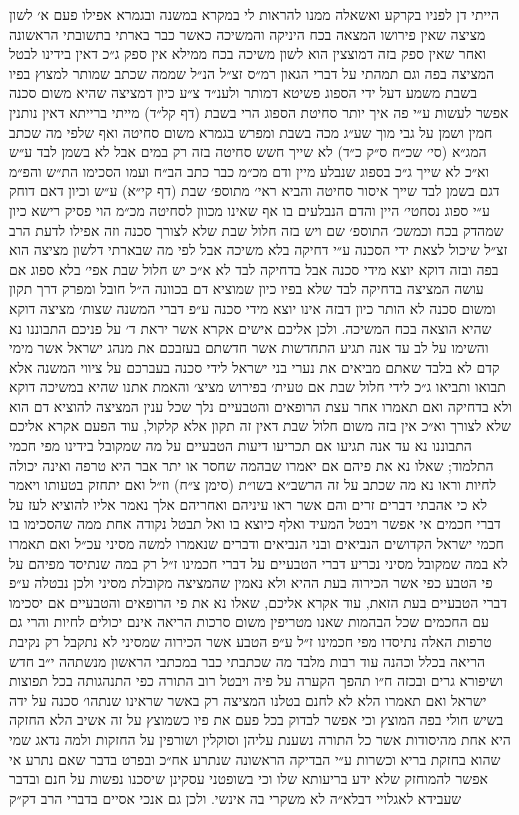 \documentclass[12pt, openany]{book}
\begin{document}
\begin{multicols}{2}
הייתי דן לפניו בקרקע ואשאלה ממנו להראות לי במקרא במשנה ובגמרא אפילו פעם א׳ לשון מציצה שאין פירושו המצאה בכח היניקה והמשיכה כאשר כבר בארתי בתשובתי הראשונה ואחר שאין ספק בזה דמוצצין הוא לשון משיכה בכח ממילא אין ספק ג״כ דאין בידינו לבטל המציצה בפה וגם תמהתי על דברי הגאון רמ״ס זצ״ל הנ״ל שממה שכתב שמותר למצוץ בפיו בשבת משמע דעל ידי הספוג פשיטא דמותר ולענ״ד צ״ע כיון דמציצה שהיא משום סכנה אפשר לעשות ע״י פה איך יותר סחיטת הספוג הרי בשבת (דף קל״ד) מייתי ברייתא דאין נותנין חמין ושמן על גבי מוך שע״ג מכה בשבת ומפרש בגמרא משום סחיטה ואף שלפי מה שכתב המג״א (סי׳ שכ״ח ס״ק כ״ד) לא שייך חשש סחיטה בזה רק במים אבל לא בשמן לבד ע״ש וא״כ לא שייך ג״כ בספוג שנבלע מיין ודם מכ״מ כבר כתב הב״ח ועמו הסכימו הת״ש והפ״מ דגם בשמן לבד שייך איסור סחיטה והביא ראי׳ מתוספ׳ שבת (דף קי״א) ע״ש וכיון דאם דוחק ע״י ספוג נסחטי׳ היין והדם הנבלעים בו אף שאינו מכוון לסחיטה מכ״מ הוי פסיק רישא כיון שמהדק בכח וכמשכ׳ התוספ׳ שם ויש בזה חלול שבת שלא לצורך סכנה וזה אפילו לדעת הרב זצ״ל שיכול לצאת ידי הסכנה ע״י דחיקה בלא משיכה אבל לפי מה שבארתי דלשון מציצה הוא בפה ובזה דוקא יוצא מידי סכנה אבל בדחיקה לבד לא א״כ יש חלול שבת אפי׳ בלא ספוג אם עושה המציצה בדחיקה לבד שלא בפיו כיון שמוציא דם בכוונה ה״ל חובל ומפרק דרך תקון ומשום סכנה לא הותר כיון דבזה אינו יוצא מידי סכנה ע״פ דברי המשנה שצות׳ מציצה דוקא שהיא הוצאה בכח המשיכה. ולכן אליכם אישים אקרא אשר יראת ד׳ על פניכם התבוננו נא והשימו על לב עד אנה תגיע התחדשות אשר חדשתם בעזבכם את מנהג ישראל אשר מימי קדם לא בלבד שאתם מביאים את נערי בני ישראל לידי סכנה בעברכם על ציווי המשנה אלא תבואו ותביאו ג״כ לידי חלול שבת אם טעית׳ בפירוש מציצ׳ והאמת אתנו שהיא במשיכה דוקא ולא בדחיקה ואם תאמרו אחר עצת הרופאים והטבעיים נלך שכל ענין המציצה להוציא דם הוא שלא לצורך וא״כ אין בזה משום חלול שבת דאין זה תקון אלא קלקול, עוד הפעם אקרא אליכם התבוננו נא עד אנה תגיעו אם תכריעו דיעות הטבעיים על מה שמקובל בידינו מפי חכמי התלמוד; שאלו נא את פיהם אם יאמרו שבהמה שחסר או יתר אבר היא טרפה ואינה יכולה לחיות וראו נא מה שכתב על זה הרשב״א בשו״ת (סימן צ״ח) וז״ל ואם יתחזק בטעותו ויאמר לא כי אהבתי דברים זרים והם אשר ראו עיניהם ואחריהם אלך נאמר אליו להוציא לעז על דברי חכמים אי אפשר ויבטל המעיד ואלף כיוצא בו ואל תבטל נקודה אחת ממה שהסכימו בו חכמי ישראל הקדושים הנביאים ובני הנביאים ודברים שנאמרו למשה מסיני עכ״ל ואם תאמרו לא במה שמקובל מסיני נכריע דברי הטבעיים על דברי חכמינו ז״ל רק במה שנתיסד מפיהם על פי הטבע כפי אשר הכירוה בעת ההיא ולא נאמין שהמציצה מקובלת מסיני ולכן נבטלה ע״פ דברי הטבעיים בעת הזאת, עוד אקרא אליכם, שאלו נא את פי הרופאים והטבעיים אם יסכימו עם החכמים שכל הבהמות שאנו מטריפין משום סרכות הריאה אינם יכולים לחיות והרי גם טרפות האלה נתיסדו מפי חכמינו ז״ל ע״פ הטבע אשר הכירוה שמסיני לא נתקבל רק נקיבת הריאה בכלל וכהנה עוד רבות מלבד מה שכתבתי כבר במכתבי הראשון מנשתהה י״ב חדש ושיפורא גרים ובכזה ח״ו תהפך הקערה על פיה ויבטל רוב התורה כפי התנהגותה בכל תפוצות ישראל ואם תאמרו הלא לא לחנם בטלנו המציצה רק באשר שראינו שנתהו׳ סכנה על ידה בשיש חולי בפה המוצץ וכי אפשר לבדוק בכל פעם את פיו כשמוצץ על זה אשיב הלא החזקה היא אחת מהיסודות אשר כל התורה נשענת עליהן וסוקלין ושורפין על החזקות ולמה נדאג שמי שהוא בחזקת בריא וכשרות ע״י הבדיקה הראשונה שנתרע אח״כ ובפרט בדבר שאם נתרע אי אפשר להמוחזק שלא ידע בריעותא שלו וכי בשופטני עסקינן שיסכנו נפשות על חנם ובדבר שעבידא לאגלויי דבלא״ה לא משקרי בה אינשי. ולכן גם אנכי אסיים בדברי הרב דק״ק 
\end{multicols}
\end{document}
